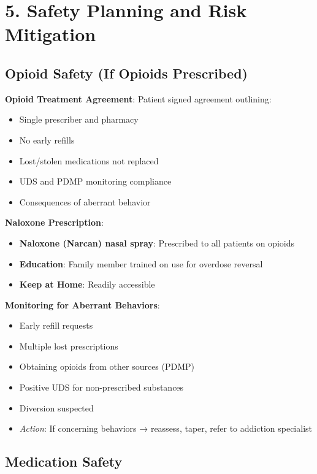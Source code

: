 \documentclass[11pt,letterpaper]{article}
\begin{document}
\section*{5. Safety Planning and Risk Mitigation}

\subsection*{Opioid Safety (If Opioids Prescribed)}

\textbf{Opioid Treatment Agreement}: Patient signed agreement outlining:
\begin{itemize}[leftmargin=*]
    \item Single prescriber and pharmacy
    \item No early refills
    \item Lost/stolen medications not replaced
    \item UDS and PDMP monitoring compliance
    \item Consequences of aberrant behavior
\end{itemize}

\textbf{Naloxone Prescription}:
\begin{itemize}[leftmargin=*]
    \item \textbf{Naloxone (Narcan) nasal spray}: Prescribed to all patients on opioids
    \item \textbf{Education}: Family member trained on use for overdose reversal
    \item \textbf{Keep at Home}: Readily accessible
\end{itemize}

\textbf{Monitoring for Aberrant Behaviors}:
\begin{itemize}[leftmargin=*]
    \item Early refill requests
    \item Multiple lost prescriptions
    \item Obtaining opioids from other sources (PDMP)
    \item Positive UDS for non-prescribed substances
    \item Diversion suspected
    \item \textit{Action}: If concerning behaviors → reassess, taper, refer to addiction specialist
\end{itemize}

\subsection*{Medication Safety}
\end{document}
